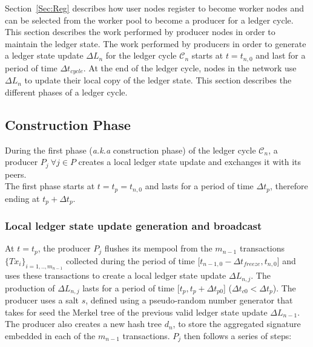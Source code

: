 Section~\ref{Sec:Reg} describes how user nodes register to become worker nodes and can be selected from the worker pool to become a producer for a ledger cycle. This section describes the work performed by producer nodes in order to maintain the ledger state. The work performed by producers in order to generate a ledger state update $\Delta L_n$ for the ledger cycle $\mathcal{C}_n$ starts at $t=t_{n,0}$ and last for a period of time $\Delta t_{cycle}$. At the end of the ledger cycle, nodes in the network use $\Delta L_n$ to update their local copy of the ledger state. This section describes the different phases of a ledger cycle. 


\subsection{Construction Phase}
\label{subsec:comp}

During the first phase (\textit{a.k.a} construction phase) of the ledger cycle $\mathcal{C}_n$, a producer $P_j~\forall j \in P$ creates a local ledger state update and exchanges it with its peers.\\

The first phase starts at $t = t_p = t_{n,0}$ and lasts for a period of time $\Delta t_{p}$, therefore ending at $t_p+\Delta t_{p}$.

\subsubsection{Local ledger state update generation and broadcast}

At $t = t_p$, the producer $P_j$ flushes its mempool from the $m_{n-1}$ transactions $\{Tx_i\}_{i=1,..,m_{n-1}}$ collected during the period of time [$t_{n-1,0} - \Delta t_{freeze}, t_{n,0}$] and uses these transactions to create a local ledger state update $\Delta L_{n,j}$. The production of $\Delta L_{n,j}$ lasts for a period of time [$t_p, t_p+ \Delta t_{p0}$] ($\Delta t_{c0} < \Delta t_{p}$). The producer uses a salt $s$, defined using a pseudo-random number generator that takes for seed the Merkel tree of the previous valid ledger state update $\Delta L_{n-1}$. The producer also creates a new hash tree $d_n$, to store the aggregated signature embedded in each of the $m_{n-1}$ transactions. $P_j$ then follows a series of steps: 

